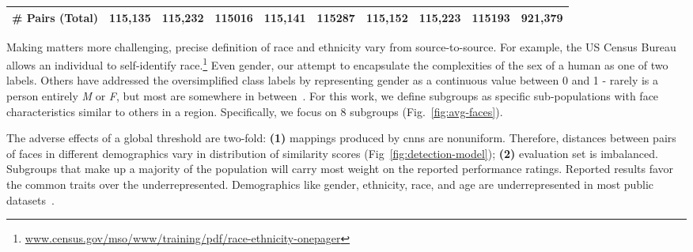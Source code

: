 \begin{table}[!t]
{{\begin{tabular}{r c c c c c c c c l}
        \# Pairs (Total) & 115,135 & 115,232    &115016 &115,141 & 115287  & 115,152  &  115,223& 115193 & 921,379\\ %
        
        \bottomrule
    \end{tabular}}
    }
    \vspace{-12pt}
\end{table}

    
    Making matters more challenging, precise definition of race and ethnicity vary from source-to-source. For example, the US Census Bureau allows an individual to self-identify race.\footnote{\scriptsize\href{https://www.census.gov/mso/www/training/pdf/race-ethnicity-onepager.pdf}{www.census.gov/mso/www/training/pdf/race-ethnicity-onepager}} Even gender, our attempt to encapsulate the complexities of the sex of a human as one of two labels. Others have addressed the oversimplified class labels by representing gender as a continuous value between 0 and 1 - rarely is a person entirely \emph{M} or \emph{F}, but most are somewhere in between~\cite{merler2019diversity}. For this work, we define subgroups as specific sub-populations with face characteristics similar to others in a region. Specifically, we focus on 8 subgroups (Fig.~\ref{fig:avg-faces}).
    
    
    The adverse effects of a global threshold are two-fold: \textbf{(1)} mappings produced by \glspl{cnn} are nonuniform. Therefore, distances between pairs of faces in different demographics vary in distribution of similarity scores (Fig~\ref{fig:detection-model}); \textbf{(2)} evaluation set is imbalanced. Subgroups that make up a majority of the population will carry most weight on the reported performance ratings. Reported results favor the common traits over the underrepresented. Demographics like gender, ethnicity, race, and age are underrepresented in most public datasets~\cite{merler2019diversity, wang2018racial}. 
    
